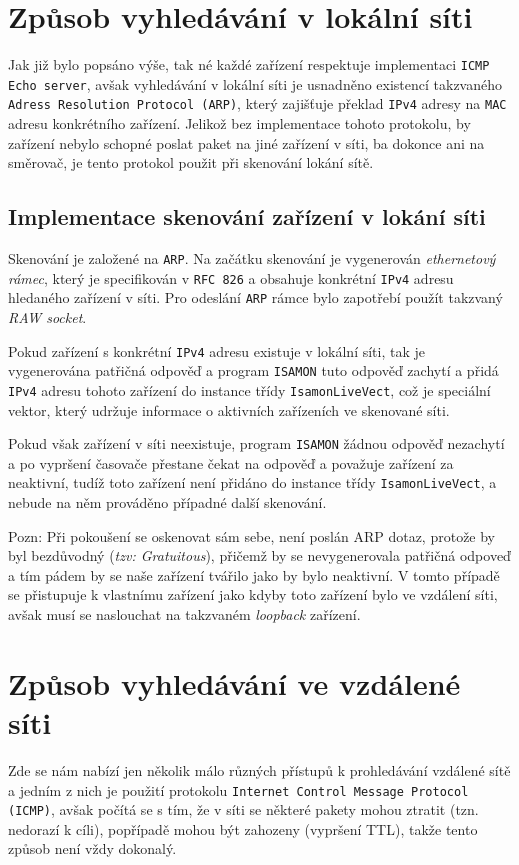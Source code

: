 \section{Způsob vyhledávání v lokální síti}
Jak již bylo popsáno výše, tak né každé zařízení respektuje implementaci \texttt{ICMP Echo server}, avšak vyhledávání v lokální síti je usnadněno existencí takzvaného \texttt{Adress Resolution Protocol (ARP)}, který zajišťuje překlad \texttt{IPv4} adresy na \texttt{MAC} adresu konkrétního zařízení. Jelikož bez implementace tohoto protokolu, by zařízení nebylo schopné poslat paket na jiné zařízení v síti, ba dokonce ani na směrovač, je tento protokol použit při skenování lokání sítě.
\newline



\subsection{Implementace skenování zařízení v lokání síti}
Skenování je založené na \texttt{ARP}. Na začátku skenování je vygenerován \textit{ethernetový rámec}, který je specifikován v \texttt{RFC 826}\cite{RFC826} a obsahuje konkrétní \texttt{IPv4} adresu hledaného zařízení v síti. Pro odeslání \texttt{ARP} rámce bylo zapotřebí použít takzvaný \textit{RAW socket}. 

Pokud zařízení s konkrétní \texttt{IPv4} adresu existuje v lokální síti, tak je vygenerována patřičná odpověď a program \texttt{ISAMON} tuto odpověď zachytí a přidá \texttt{IPv4} adresu tohoto zařízení do instance třídy \texttt{IsamonLiveVect}, což je speciální vektor, který udržuje informace o aktivních zařízeních ve skenované síti.

Pokud však zařízení v síti neexistuje, program \texttt{ISAMON} žádnou odpověď nezachytí a po vypršení časovače přestane čekat na odpověď a považuje zařízení za neaktivní, tudíž toto zařízení není přidáno do instance třídy \texttt{IsamonLiveVect}, a nebude na něm prováděno případné další skenování.
\newline

Pozn: Při pokoušení se oskenovat sám sebe, není poslán ARP dotaz, protože by byl bezdůvodný (\textit{tzv: Gratuitous}), přičemž by se nevygenerovala patřičná odpoveď a tím pádem by se naše zařízení tvářilo jako by bylo neaktivní. V tomto případě se přistupuje k vlastnímu zařízení jako kdyby toto zařízení bylo ve vzdálení síti, avšak musí se naslouchat na takzvaném \textit{loopback} zařízení.

\section{Způsob vyhledávání ve vzdálené síti}
Zde se nám nabízí jen několik málo různých přístupů k prohledávání vzdálené sítě a jedním z nich je použití protokolu \texttt{Internet Control Message Protocol (ICMP)}, avšak počítá se s tím, že v síti se některé pakety mohou ztratit (tzn. nedorazí k cíli), popřípadě mohou být zahozeny (vypršení TTL), takže tento způsob není vždy dokonalý.

